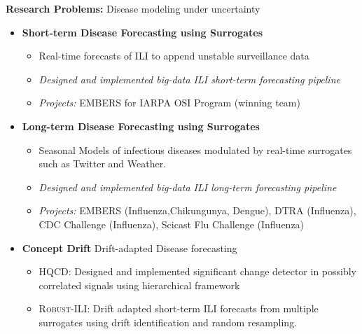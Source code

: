 \par{\textbf{Research Problems:} Disease modeling under uncertainty\vspace{0.5em}
\begin{itemize}
 \item  \textbf{Short-term Disease Forecasting using Surrogates}
   \begin{itemize}
     \item Real-time forecasts of ILI to append unstable surveillance data
     \item \textit{Designed and implemented big-data ILI short-term forecasting pipeline}  
     \item \textit{Projects:} EMBERS for IARPA OSI Program (winning team)
   \end{itemize}\vspace{0.25em}
 \item \textbf{Long-term Disease Forecasting using Surrogates}
   \begin{itemize}
     \item Seasonal Models of infectious diseases modulated by real-time surrogates such as Twitter and Weather.
     \item \textit{Designed and implemented big-data ILI long-term forecasting pipeline}  
     \item \textit{Projects:} EMBERS (Influenza,Chikungunya, Dengue), DTRA (Influenza),
       CDC Challenge (Influenza),  Scicast Flu Challenge (Influenza)
   \end{itemize}\vspace{0.25em}
 \item \textbf{Concept Drift} Drift-adapted Disease forecasting 
   \begin{itemize}
     \item {\textsc{HQCD}}: Designed and implemented significant change detector
       in possibly correlated signals using hierarchical framework
     \item {\textsc{Robust-ILI}}: Drift adapted short-term ILI forecasts from
       multiple surrogates using drift identification and random resampling.
   \end{itemize}
\end{itemize}
}
